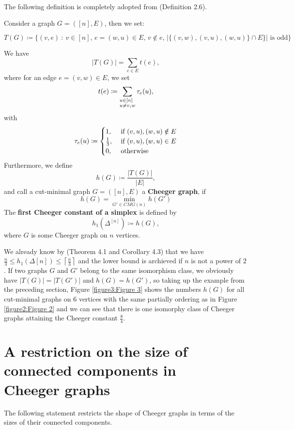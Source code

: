 The following definition is completely adopted from \cite{1} (Definition 2.6).
\begin{defi}\label{definition1}
Consider a graph \(G=([n],E)\), then we set:
\begin{small}
\[
T(G)\coloneqq \{(v,e)\: :\: v\in [n]\text{, }e=(w,u)\in E\text{, }v\notin e\text{, }|\{(v,w),(v,u),(w,u)\}\cap E\}|\text{ is odd}\}
\]
\end{small}
We have
\[
|T(G)|=\sum\limits_{e\in E}t(e),
\]
where for an edge \(e=(v,w)\in E\), we set
\[
t(e)\coloneqq \sum\limits_{\begin{subarray}{l}u\in[n]\\ u\neq v,w\end{subarray}}\tau_e(u),
\]
with
\begin{equation}
\tau_e(u)\coloneqq 
\begin{cases}
1,&\text{ if }(v,u),(w,u)\notin E\notag\\
\frac{1}{3},&\text{ if }(v,u),(w,u)\in E\notag\\
0,&\text{ otherwise}\notag
\end{cases}
\end{equation}
Furthermore, we define
\[
h(G)\coloneqq \frac{|T(G)|}{|E|},
\]
and call a cut-minimal graph \(G=([n],E)\) a \textbf{Cheeger graph}, if
\[
h(G)=\min\limits_{G'\in CMG(n)}h(G')
\]
The \textbf{first Cheeger constant of a simplex} is defined by
\[
h_1(\Delta^{[n]})\coloneqq h(G),
\]
where \(G\) is some Cheeger graph on \(n\) vertices.
\end{defi}
We already know by \cite{1} (Theorem 4.1 and Corollary 4.3) that we have \(\frac{n}{3}\leq h_1(\Delta{[n]})\leq\left\lceil\frac{n}{3}\right\rceil\) and the lower bound is archieved if \(n\) is not a power of \(2\). If two graphs \(G\) and \(G'\) belong to the same isomorphism class, we obviously have \(|T(G)|=|T(G')|\) and \(h(G)=h(G')\), so taking up the example from the preceding section, Figure \ref{figure3:Figure 3} shows the numbers \(h(G)\) for all cut-minimal graphs on \(6\) vertices with the same partially ordering as in Figure \ref{figure2:Figure 2} and we can see that there is one isomorphy class of Cheeger graphs attaining the Cheeger constant \(\frac{8}{4}\).



\section{A restriction on the size of connected components in\\ Cheeger graphs}
The following statement restricts the shape of Cheeger graphs in terms of the sizes of their connected components.

